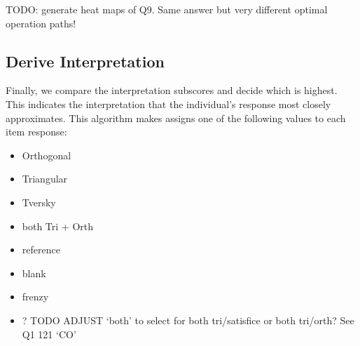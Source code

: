 \documentclass[
  letterpaper,
  DIV=11,
  numbers=noendperiod]{scrreprt}
\begin{document}
TODO: generate heat maps of Q9. Same answer but very different optimal
operation paths!

\hypertarget{derive-interpretation}{%
\subsection{Derive Interpretation}\label{derive-interpretation}}

Finally, we compare the interpretation subscores and decide which is
highest. This indicates the interpretation that the individual's
response most closely approximates. This algorithm makes assigns one of
the following values to each item response:

\begin{itemize}
\item
  Orthogonal
\item
  Triangular
\item
  Tversky
\item
  both Tri + Orth
\item
  reference
\item
  blank
\item
  frenzy
\item
  ? TODO ADJUST `both' to select for both tri/satisfice or both
  tri/orth? See Q1 121 `CO'
\end{itemize}
\end{document}

